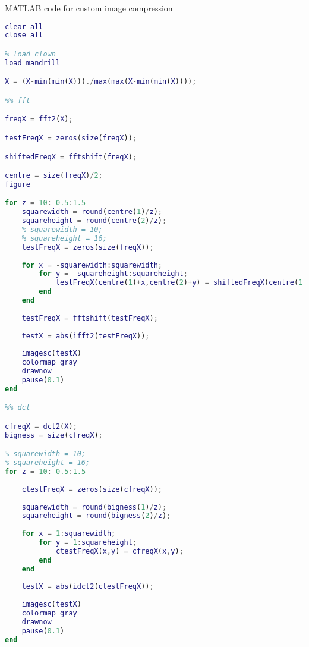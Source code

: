 MATLAB code for custom image compression

\begin{lstlisting}[language=Matlab, label = lst:cust_comp1]
clear all
close all

% load clown
load mandrill

X = (X-min(min(X)))./max(max(X-min(min(X))));

%% fft

freqX = fft2(X);

testFreqX = zeros(size(freqX));

shiftedFreqX = fftshift(freqX);

centre = size(freqX)/2;
figure

for z = 10:-0.5:1.5
    squarewidth = round(centre(1)/z);
    squareheight = round(centre(2)/z);
    % squarewidth = 10;
    % squareheight = 16;
    testFreqX = zeros(size(freqX));
    
    for x = -squarewidth:squarewidth;
        for y = -squareheight:squareheight;
            testFreqX(centre(1)+x,centre(2)+y) = shiftedFreqX(centre(1)+x,centre(2)+y);
        end
    end
    
    testFreqX = fftshift(testFreqX);
    
    testX = abs(ifft2(testFreqX));
    
    imagesc(testX)
    colormap gray
    drawnow
    pause(0.1)
end

%% dct

cfreqX = dct2(X);
bigness = size(cfreqX);

% squarewidth = 10;
% squareheight = 16;
for z = 10:-0.5:1.5
    
    ctestFreqX = zeros(size(cfreqX));
    
    squarewidth = round(bigness(1)/z);
    squareheight = round(bigness(2)/z);
    
    for x = 1:squarewidth;
        for y = 1:squareheight;
            ctestFreqX(x,y) = cfreqX(x,y);
        end
    end
    
    testX = abs(idct2(ctestFreqX));
    
    imagesc(testX)
    colormap gray
    drawnow
    pause(0.1)
end
\end{lstlisting}


